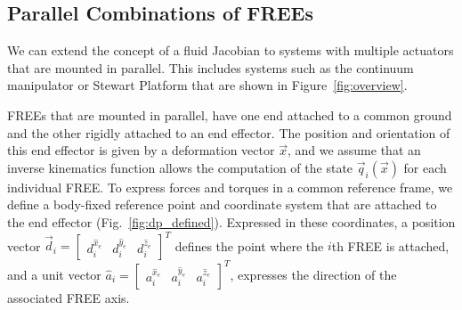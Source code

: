 \subsection{Parallel Combinations of FREEs}
\label{sec:parallelActuators}
We can extend the concept of a fluid Jacobian to systems with multiple actuators that are mounted in parallel.
This includes systems such as the continuum manipulator or Stewart Platform that are shown in Figure~\ref{fig:overview}.


FREEs that are mounted in parallel, have one end attached to a common ground and the other rigidly attached to an end effector.
The position and orientation of this end effector is given by a deformation vector $\vec{x}$, and we assume that an inverse kinematics function allows the computation of the state $\vec{q}_i \left(\vec{x}\right)$ for each individual FREE.
To express forces and torques in a common reference frame, we define a body-fixed reference point and coordinate system that are attached to the end effector (Fig.~\ref{fig:dp_defined}). 
Expressed in these coordinates, a position vector ${\vec{d}_i = \begin{bmatrix} d_i^{\hat{x}_e} & d_i^{\hat{y}_e} & d_i^{\hat{z}_e} \end{bmatrix}^T}$ defines the point where the $i$th FREE is attached, and a unit vector ${\hat{a}_i = \begin{bmatrix} a_i^{\hat{x}_e} & a_i^{\hat{y}_e} & a_i^{\hat{z}_e} \end{bmatrix}^T}$, expresses the direction of the associated FREE axis.

